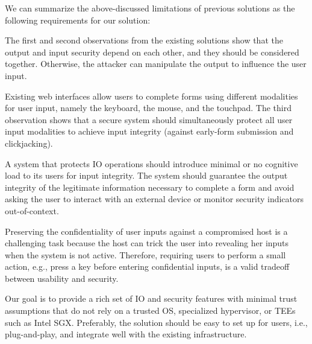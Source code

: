 We can summarize the above-discussed limitations of previous solutions as the following requirements for our solution:

The first and second observations from the existing solutions show that the output and input security depend on each other, and they should be considered together. Otherwise, the attacker can manipulate the output to influence the user input.

Existing web interfaces allow users to complete forms using different modalities for user input, namely the keyboard, the mouse, and the touchpad. The third observation shows that a secure system should simultaneously protect all user input modalities to achieve input integrity (against early-form submission and clickjacking).


A system that protects IO operations should introduce minimal or no cognitive load to its users for input integrity.
The system should guarantee the output integrity of the legitimate information necessary to complete a form and avoid asking the user to interact with an external device or monitor security indicators out-of-context.


 Preserving the confidentiality of user inputs against a compromised host is a challenging task because the host can trick the user into revealing her inputs when the system is not active. Therefore, requiring users to perform a small action, e.g., press a key before entering confidential inputs, is a valid tradeoff between usability and security.


Our goal is to provide a rich set of IO and security features with minimal trust assumptions that do not rely on a trusted OS, specialized hypervisor, or TEEs such as Intel SGX. Preferably, the solution should be easy to set up for users, i.e., plug-and-play, and integrate well with the existing infrastructure.  
